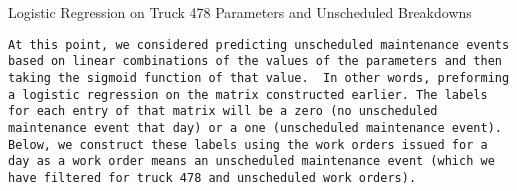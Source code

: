\documentclass[11pt]{article}
\begin{document}
    Logistic Regression on Truck 478 Parameters and Unscheduled Breakdowns

\begin{verbatim}
At this point, we considered predicting unscheduled maintenance events based on linear combinations of the values of the parameters and then taking the sigmoid function of that value.  In other words, preforming a logistic regression on the matrix constructed earlier. The labels for each entry of that matrix will be a zero (no unscheduled maintenance event that day) or a one (unscheduled maintenance event). Below, we construct these labels using the work orders issued for a day as a work order means an unscheduled maintenance event (which we have filtered for truck 478 and unscheduled work orders).
\end{verbatim}
\end{document}
